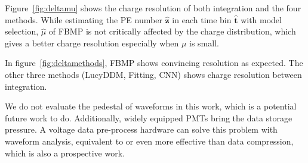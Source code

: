 Figure~\ref{fig:deltamu} shows the charge resolution of both integration and the four methods. While estimating the PE number $\hat{\bm{z}}$ in each time bin $\hat{\bm{t}}$ with model selection, $\hat{\mu}$ of FBMP is not critically affected by the charge distribution, which gives a better charge resolution especially when $\mu$ is small. 

In figure~\ref{fig:deltamethods}, FBMP shows convincing resolution as expected. The other three methods (LucyDDM, Fitting, CNN) shows charge resolution between integration. 


We do not evaluate the pedestal of waveforms in this work, which is a potential future work to do. Additionally, widely equipped PMTs bring the data storage pressure. A voltage data pre-process hardware can solve this problem with waveform analysis, equivalent to or even more effective than data compression, which is also a prospective work. 
